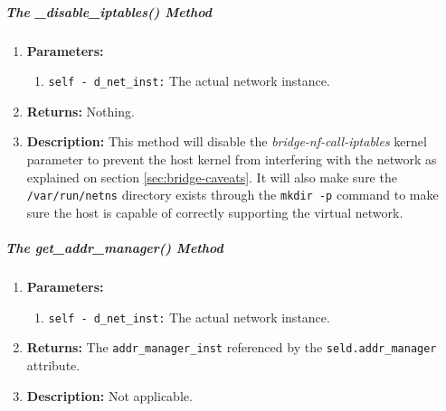         \subparagraph{The \_disable\_iptables() Method}
            \begin{enumerate}
                \item \textbf{Parameters:}
                \begin{enumerate}
                    \item \texttt{self - d\_net\_inst:} The actual network instance.
                \end{enumerate}
                \item \textbf{Returns:} Nothing.
                \item \textbf{Description:} This method will disable the \textit{bridge-nf-call-iptables} kernel parameter to prevent the host kernel from interfering with the network as explained on section \ref{sec:bridge-caveats}. It will also make sure the \texttt{/var/run/netns} directory exists through the \texttt{mkdir -p} command to make sure the host is capable of correctly supporting the virtual network.
            \end{enumerate}

        \subparagraph{The get\_addr\_manager() Method}
            \begin{enumerate}
                \item \textbf{Parameters:}
                \begin{enumerate}
                    \item \texttt{self - d\_net\_inst:} The actual network instance.
                \end{enumerate}
                \item \textbf{Returns:} The \texttt{addr\_manager\_inst} referenced by the \texttt{seld.addr\_manager} attribute.
                \item \textbf{Description:} Not applicable.
            \end{enumerate}

